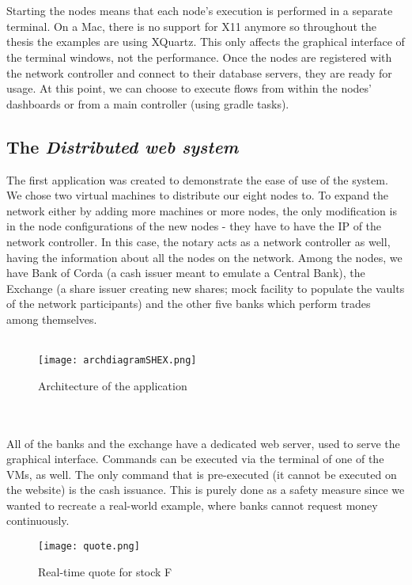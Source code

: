 \documentclass[12pt,twoside]{article}
\begin{document}
\\ \\
Starting the nodes means that each node's execution is performed in a separate terminal. On a Mac, there is no support for X11 anymore so throughout the thesis the examples are using XQuartz. This only affects the graphical interface of the terminal windows, not the performance. Once the nodes are registered with the network controller and connect to their database servers, they are ready for usage. At this point, we can choose to execute flows from within the nodes' dashboards or from a main controller (using gradle tasks).
\subsection{The \textit{Distributed web system}}
\label{sub:sharedEX}
The first application was created to demonstrate the ease of use of the system. We chose two virtual machines to distribute our eight nodes to. To expand the network either by adding more machines or more nodes, the only modification is in the node configurations of the new nodes - they have to have the IP of the network controller. In this case, the notary acts as a network controller as well, having the information about all the nodes on the network. Among the nodes, we have Bank of Corda (a cash issuer meant to emulate a Central Bank), the Exchange (a share issuer creating new shares; mock facility to populate the vaults of the network participants) and the other five banks which perform trades among themselves.
\\ \\
\begin{figure}[!htb]
\centering
\texttt{[image: archdiagramSHEX.png]}
\caption{Architecture of the application}
\centering
\label{fig:shEx}
\end{figure}
\\ \\
All of the banks and the exchange have a dedicated web server, used to serve the graphical interface. Commands can be executed via the terminal of one of the VMs, as well. The only command that is pre-executed (it cannot be executed on the website) is the cash issuance. This is purely done as a safety measure since we wanted to recreate a real-world example, where banks cannot request money continuously. 
\\
\begin{figure}[!htb]
\centering
\texttt{[image: quote.png]}
\caption{Real-time quote for stock F}
\centering
\label{fig:quote}
\end{figure}
\end{document}
